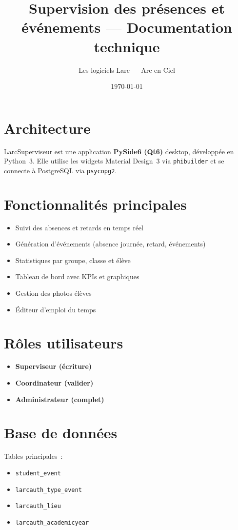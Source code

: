 \documentclass[11pt,a4paper]{article}
\title{\color{larcblue}Supervision des présences et événements — Documentation technique}
\author{Les logiciels Larc — Arc-en-Ciel}
\date{\today}
\begin{document}
\maketitle
\tableofcontents
\newpage

\section{Architecture}

LarcSuperviseur est une application \textbf{PySide6 (Qt6)} desktop,
développée en Python~3. Elle utilise les widgets Material Design~3 via
\texttt{phibuilder} et se connecte à PostgreSQL via \texttt{psycopg2}.

\section{Fonctionnalités principales}

\begin{itemize}
  \item Suivi des absences et retards en temps réel
  \item Génération d'événements (absence journée, retard, événements)
  \item Statistiques par groupe, classe et élève
  \item Tableau de bord avec KPIs et graphiques
  \item Gestion des photos élèves
  \item Éditeur d'emploi du temps
\end{itemize}

\section{Rôles utilisateurs}

\begin{itemize}
  \item \textbf{Superviseur (écriture)}
  \item \textbf{Coordinateur (valider)}
  \item \textbf{Administrateur (complet)}
\end{itemize}

\section{Base de données}

Tables principales~:

\begin{itemize}
  \item \texttt{student\_event}
  \item \texttt{larcauth\_type\_event}
  \item \texttt{larcauth\_lieu}
  \item \texttt{larcauth\_academicyear}
\end{itemize}
\end{document}
